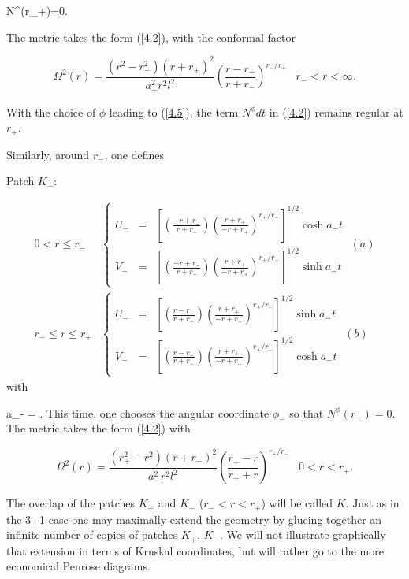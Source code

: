 \bb
N^{\phi}(r_{+})=0.
\label{4.5}
\ee

The metric takes the form (\ref{4.2}), with the conformal factor

\begin{equation}
\Omega^2 (r)= \frac{(r^2-r_{-}^2)(r+r_{+})^2}{a_{+}^2 r^2 l^2} \left(
\frac{r-r_{-}}{r+r_{-}} \right)^{r_{-}/r_{+}} \;\;\;  r_{-}
< r <\infty .
\label{4.6}
\end{equation}

With the choice of $\phi$ leading to (\ref{4.5}), the term
$N^{\phi} dt$ in (\ref{4.2}) remains regular at $r_+$.

Similarly, around $r_{-}$, one defines

Patch $K_{-}$:

\begin{equation} \begin{array}{cl}
0 <r \leq r_{-} & \left\{ \begin{array}{lcr}
U_{-} &=& \left[ \left( \frac{-r+r_{-}}{r+r_{-}} \right)\left(
\frac{r+r_{+}}{-r+r_{+}} \right)^{r_{+}/r_{-}} \right]^{1/2}
\cosh a_- t  \\
V_{-} &=& \left[ \left( \frac{-r+r_{-}}{r+r_{-}} \right)\left(
\frac{r+r_{+}}{-r+r_{+}} \right)^{r_{+}/r_{-}} \right]^{1/2}
\sinh a_- t
 \end{array}  \right. \; (a) \\
r_{-} \leq r \leq r_{+} & \left\{  \begin{array}{lcr}
U_{-} &=& \left[ \left( \frac{r-r_-}{r+r_-} \right)\left(
\frac{r+r_{+}}{-r+r_{+}} \right)^{r_{+}/r_{-}} \right]^{1/2}
\sinh a_- t \\
V_{-} &=& \left[ \left( \frac{r-r_-}{r+r_-} \right)\left(
\frac{r+r_{+}}{-r+r_{+}} \right)^{r_{+}/r_{-}} \right]^{1/2}
\cosh a_{-} t
\end{array}  \right. \;(b)
\end{array} \label{4.7}
\end{equation}
%
with

\bb
a_{-} = .
\label{4.8}
\ee
%
This time, one chooses the angular coordinate $\phi_{-}$ so that
$N^{\phi}(r_{-}) = 0$. The metric takes the form (\ref{4.2}) with

\begin{equation}
\Omega^2 (r)= \frac{(r_{+}^2-r^2)(r+r_{-})^2}{a_{-}^2 r^2 l^2} \left(
\frac{r_{+}-r}{r_{+}+r} \right)^{r_{+}/r_{-}} \;\;\; 0< r < r_{+}.
\label{4.9}
\end{equation}

The overlap  of the patches $K_{+}$ and $K_{-}$
($r_{-}<r<r_{+}$) will be called $K$. Just as in the 3+1 case
one may maximally extend the geometry by glueing together an
infinite number of copies of patches $K_{+}$, $K_{-}$. We will
not illustrate graphically that extension in terms of Kruskal
coordinates, but will rather go to the more economical Penrose
diagrams.


